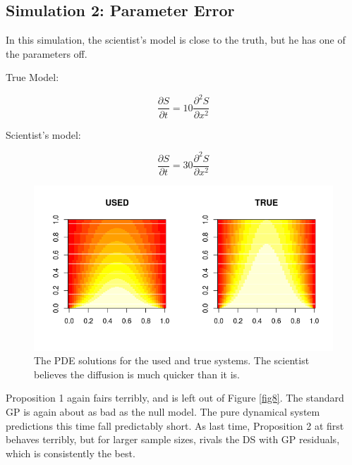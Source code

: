 \documentclass{article}
\begin{document}
	
	\subsection{Simulation 2: Parameter Error}
	
	In this simulation, the scientist's model is close to the truth, but he has one of the parameters off.
	
	True Model:
	
	$$\frac{\partial S}{\partial t} = 10 \frac{\partial^2 S}{\partial x^2}$$
	
	Scientist's model:
	
	$$\frac{\partial S}{\partial t} = 30 \frac{\partial^2 S}{\partial x^2}$$
	
	
	\begin{figure}[H]
		\includegraphics[scale=0.7]{FinalImage3.png}
		\caption{The PDE solutions for the used and true systems. The scientist believes the diffusion is much quicker than it is.}
		\label{fig7}
	\end{figure}
	
	Proposition 1 again fairs terribly, and is left out of Figure \ref{fig8}. The standard GP is again about as bad as the null model. The pure dynamical system predictions this time fall predictably short. As last time, Proposition 2 at first behaves terribly, but for larger sample sizes, rivals the DS with GP residuals, which is consistently the best.
	
\end{document}
